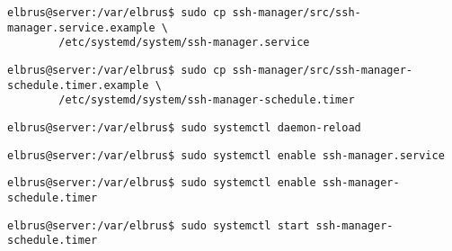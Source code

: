 	\lstset{style=commands}
	\begin{lstlisting}[caption={Kopieren des Serviceprogrammes.}]
		elbrus@server:/var/elbrus$ sudo cp ssh-manager/src/ssh-manager.service.example \
		/etc/systemd/system/ssh-manager.service
	\end{lstlisting}
	
	\lstset{style=commands}
	\begin{lstlisting}[caption={Kopieren des Zeitplanungsprogrammes.}]
		elbrus@server:/var/elbrus$ sudo cp ssh-manager/src/ssh-manager-schedule.timer.example \
		/etc/systemd/system/ssh-manager-schedule.timer
	\end{lstlisting}
	
	\lstset{style=commands}
	\begin{lstlisting}[caption={Neuladen des 'systemctl' Deamons.}]
		elbrus@server:/var/elbrus$ sudo systemctl daemon-reload
	\end{lstlisting}
	
	\lstset{style=commands}
	\begin{lstlisting}[caption={Aktivieren des Serviceprogrammes.}]
		elbrus@server:/var/elbrus$ sudo systemctl enable ssh-manager.service
	\end{lstlisting}
	
	\lstset{style=commands}
	\begin{lstlisting}[caption={Aktivieren des Zeitplanungsprogrammes.}]
		elbrus@server:/var/elbrus$ sudo systemctl enable ssh-manager-schedule.timer
	\end{lstlisting}
	
	\lstset{style=commands}
	\begin{lstlisting}[caption={Starten des Zeitplanungsprogrammes.}]
		elbrus@server:/var/elbrus$ sudo systemctl start ssh-manager-schedule.timer
	\end{lstlisting}